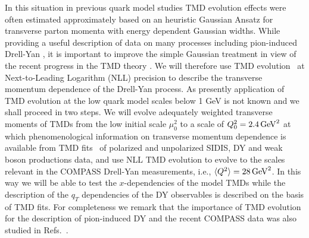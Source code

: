 \documentclass[a4paper]{article}
\begin{document}
\begin{itemize}
In this situation in previous quark model studies 
TMD evolution effects were often estimated approximately
\cite{Boffi:2009sh,Pasquini:2011tk,Pasquini:2014ppa} based on
an heuristic Gaussian Ansatz for transverse parton momenta with
energy dependent Gaussian widths. While providing a useful 
description of data on many processes including pion-induced Drell-Yan
\cite{Schweitzer:2010tt}, it is important to improve the simple Gaussian treatment in view of the recent progress in the TMD theory  
\cite{Gehrmann:2014yya,Echevarria:2015byo,Echevarria:2015usa,Echevarria:2016scs,Li:2016ctv,Vladimirov:2016dll,Luo:2019hmp,Luo:2019szz,Ebert:2020yqt,Gutierrez-Reyes:2017glx,Gutierrez-Reyes:2018iod,Ji:2006ub,Koike:2007dg,Sun:2013hua,Dai:2014ala,Scimemi:2019gge,Moos:2020wvd}.
We will therefore use TMD evolution~\cite{Collins:2011zzd} 
at  Next-to-Leading Logarithm (NLL) precision 
to describe the transverse momentum dependence of the Drell-Yan process.
As presently application of TMD evolution at the low quark 
model scales below 1 GeV is not known and we shall proceed in two steps. We will evolve adequately weighted
transverse moments of TMDs from the low initial scale $\mu_{0}^{2}$ to a scale of $Q_0^2=2.4\,{\rm GeV}^2$
at which phenomenological information on transverse momentum dependence 
is available from TMD fits~\cite{Su:2014wpa, Kang:2014zza,Kang:2015msa, Bacchetta:2017gcc,Scimemi:2019cmh,Bacchetta:2019sam} of polarized and unpolarized SIDIS, DY and weak boson productions data, and use NLL TMD  evolution to evolve to the scales relevant in the %
COMPASS Drell-Yan measurements, i.e., $\langle Q^2\rangle=28\,{\rm GeV}^2$.
In this way we will be able to test the $x$-dependencies of the model TMDs 
while the description of the $q_T$ dependencies of the DY observables
is described on the basis of TMD fits. 
%
%
For completeness we remark that the importance of TMD evolution
for the description of pion-induced DY and the recent COMPASS
data was also studied in
Refs.~\cite{Wang:2017zym,Vladimirov:2019bfa,Li:2019uhj,Ceccopieri:2018nop,
Wang:2018naw,Wang:2018pmx}.



\end{itemize}
\end{document}
